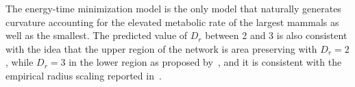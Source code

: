 \documentclass[12pt]{article}
\begin{document}
The energy-time minimization model is the only model that naturally generates curvature accounting for the elevated metabolic rate of the largest
mammals as well as the smallest. The predicted value of $D_r$ between 2 and 3 is also consistent with the idea that the upper region of the network
is area preserving with $D_r = 2$, while $D_r = 3$ in the lower region as proposed by~\cite{west97}, and it is consistent with the empirical radius
scaling reported in~\cite{newberry2015testing}.


\end{document}
